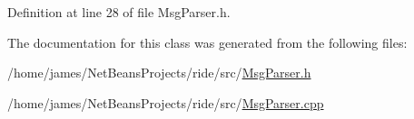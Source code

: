 Definition at line 28 of file Msg\-Parser.\-h.



The documentation for this class was generated from the following files\-:\begin{DoxyCompactItemize}
\item 
/home/james/\-Net\-Beans\-Projects/ride/src/\hyperlink{_msg_parser_8h}{Msg\-Parser.\-h}\item 
/home/james/\-Net\-Beans\-Projects/ride/src/\hyperlink{_msg_parser_8cpp}{Msg\-Parser.\-cpp}\end{DoxyCompactItemize}
